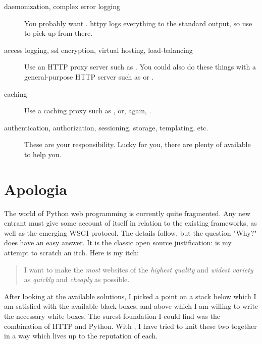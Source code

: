 \begin{description}

\item[daemonization, complex error logging]
    {You probably want . httpy logs everything to the
    standard output, so use
     to pick up from
    there.}

\item[access logging, ssl encryption, virtual hosting, load-balancing]
    {Use an HTTP proxy server such as .
    You could also do these things with a general-purpose HTTP server such as
     or
    .}

\item[caching]
    {Use a caching proxy such as , or,
    again, .}

\item[authentication, authorization, sessioning, storage, templating, etc.]
    {These are your responsibility. Lucky for you, there are plenty of
     available to help
    you.}

\end{description}



\section{Apologia \label{apologia}}

The world of Python web programming is currently quite fragmented. Any new
entrant must give some account of itself in relation to the existing frameworks,
as well as the emerging WSGI protocol. The details follow, but the question
"Why?" does have an easy answer. It is the classic open source justification:
 is my attempt to scratch an itch. Here is my itch:

\begin{quote} I want to make the \emph{most} websites of the \emph{highest
quality} and \emph{widest variety} as \emph{quickly} and \emph{cheaply} as
possible. \end{quote}

After looking at the available solutions, I picked a point on a stack below
which I am satisfied with the available black boxes, and above which I am
willing to write the necessary white boxes. The surest foundation I could find
was the combination of HTTP and Python. With , I have tried to
knit these two together in a way which lives up to the reputation of each.


